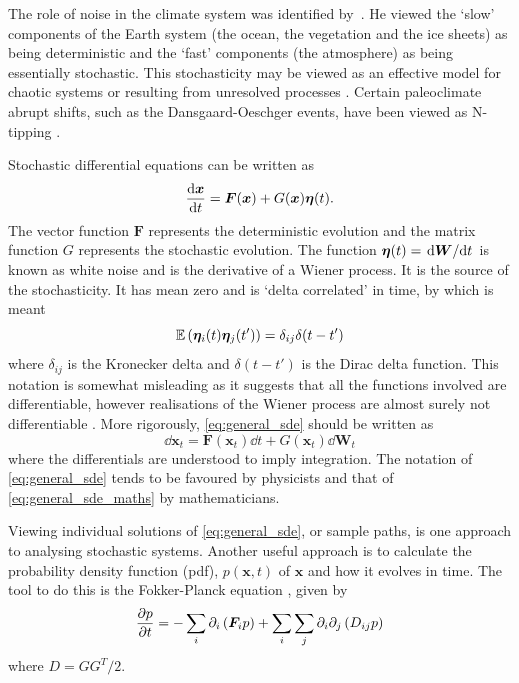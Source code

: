 The role of noise in the climate system was identified by~\cite{Hasselmann1976}. He viewed the `slow' components of the Earth system (the ocean, the vegetation and the ice sheets) as being
deterministic and the `fast' components (the atmosphere) as being essentially stochastic. This stochasticity may be viewed as an effective model for chaotic systems \parencite{Lorenz1963}
or resulting from unresolved processes \parencite{Palmer2009}. Certain paleoclimate abrupt shifts, such as the Dansgaard-Oeschger events, have been viewed as N-tipping \parencite{Ditlevsen1999}.

Stochastic differential equations can be written \parencite{Jacobs2010} as
\begin{equation}
  \label{eq:general_sde}
  \dv{\bm{x}}{t} = \bm{F}(\bm{x}) + G(\bm{x})\bm{\eta}(t).
\end{equation}
The vector function $\bm{F}$ represents the deterministic evolution and the matrix function $G$ represents the stochastic evolution. The function
$\bm{\eta}(t) = \dv*{\bm{W}}{t}$ is known as white noise and is the derivative of a Wiener process. It is the source of the stochasticity.
It has mean zero and is `delta correlated' in time, by which is meant
\begin{equation}
  \label{eq:eta_correlation}
  \operatorname*{\mathbb{E}}\left(\bm{\eta}_i(t)\bm{\eta}_j(t')\right) = \delta_{ij}\delta(t-t')
\end{equation}
where $\delta_{ij}$ is the Kronecker delta and $\delta(t-t')$ is the Dirac delta function. This notation is somewhat misleading as it suggests that all the functions involved are
differentiable, however realisations of the Wiener process are almost surely not differentiable \parencite{Mckean2014}. More rigorously, \cref{eq:general_sde} should be written as
\begin{equation}
  \label{eq:general_sde_maths}
  \dd{\bm{x}_t} = \bm{F}(\bm{x}_t)\dd{t} + G(\bm{x}_t)\dd{\bm{W}_t}
\end{equation}
where the differentials are understood to imply integration. The notation of \cref{eq:general_sde} tends to be favoured by physicists and that of \cref{eq:general_sde_maths} by
mathematicians.

Viewing individual solutions of \cref{eq:general_sde}, or sample paths, is one approach  to analysing stochastic systems. Another useful approach is to calculate the probability density function
(pdf), $p(\bm{x},t)$ of $\bm{x}$ and how it evolves in time. The tool to do this is the Fokker-Planck equation \parencite{Fokker1914,Planck1917}, given by
\begin{equation}
  \label{eq:fokker_planck}
  \pdv{p}{t} = - \sum_i \partial_i \left(\bm{F}_i p\right) + \sum_i\sum_j \partial_i\partial_j \left(D_{ij} p\right)
\end{equation}
where $D = GG^T/2$.

